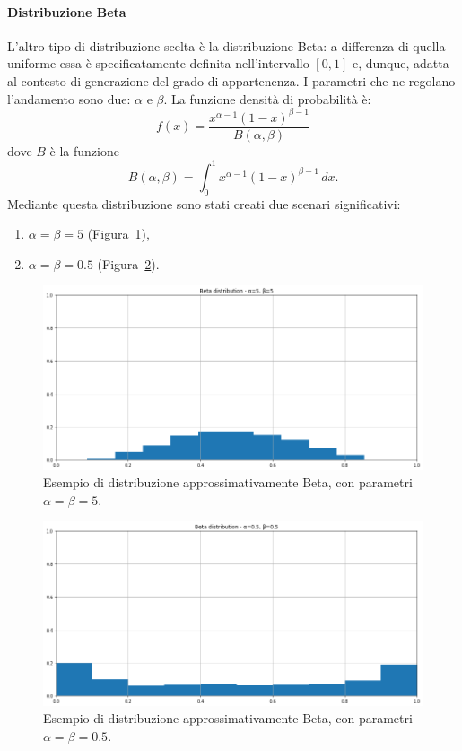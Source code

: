 \documentclass[12pt]{report}
\theoremstyle{definition}
\begin{document}
\paragraph{Distribuzione Beta}
L'altro tipo di distribuzione scelta è la distribuzione Beta: a differenza di quella uniforme essa è specificatamente definita nell'intervallo $[0,1]$ e, dunque, adatta al contesto di generazione del grado di appartenenza. I parametri che ne regolano l'andamento sono due: $\alpha$ e $\beta$. La funzione densità di probabilità è:
\begin{equation}
    f(x)= \frac{x^{\alpha - 1}(1-x)^{\beta - 1}}{B(\alpha, \beta)}
\end{equation}
dove $B$ è la funzione
\begin{equation}
    B(\alpha, \beta) = \int_{0}^{1} x^{\alpha - 1}(1-x)^{\beta - 1} \,dx.
\end{equation}
Mediante questa distribuzione sono stati creati due scenari significativi:
\begin{enumerate}
    \item $\alpha = \beta = 5$ (Figura~\ref{beta5}),
    \item $\alpha = \beta = 0.5$ (Figura~\ref{beta05}).
\end{enumerate}
\begin{figure}
    \centering
    \includegraphics[scale=0.4]{images/beta5.png}
    \caption{Esempio di distribuzione approssimativamente Beta, con parametri $\alpha = \beta = 5$.}
    \label{beta5}
\end{figure}
\begin{figure}
    \centering
    \includegraphics[scale=0.4]{images/beta05.png}
    \caption{Esempio di distribuzione approssimativamente Beta, con parametri $\alpha = \beta = 0.5$.}
    \label{beta05}
\end{figure}
\end{document}
